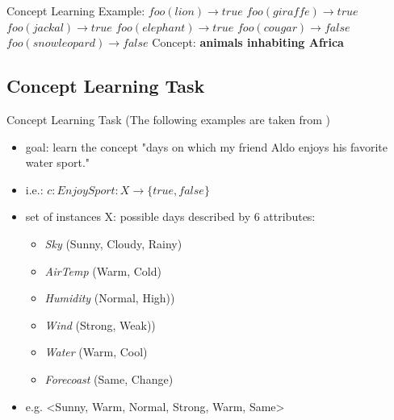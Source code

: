 \documentclass{beamer}
\begin{document}
\begin{frame}{Concept Learning}
Example:\newline
$foo(lion) \rightarrow true $\newline
$foo(giraffe) \rightarrow true $\newline
$foo(jackal) \rightarrow true $\newline
$foo(elephant) \rightarrow true $\newline
$foo(cougar) \rightarrow false $\newline
$foo(snow leopard) \rightarrow false $\newline
Concept: \textbf{animals inhabiting Africa}
\end{frame}

\subsection{Concept Learning Task}
\begin{frame}{Concept Learning Task}
(The following examples are taken from \cite{mitchell1997a})
\begin{itemize}
\item goal: learn the concept "days on which my friend Aldo enjoys his favorite water sport."
\item i.e.: $c: EnjoySport: X \rightarrow \{true, false\}$
\item set of instances X: possible days described by 6 attributes: \begin{itemize}
\item \emph{Sky} (Sunny, Cloudy, Rainy)
\item \emph{AirTemp} (Warm, Cold)
\item \emph{Humidity} (Normal, High))
\item \emph{Wind} (Strong, Weak))
\item \emph{Water} (Warm, Cool)
\item \emph{Forecoast} (Same, Change)
\end{itemize}
\item e.g. <Sunny, Warm, Normal, Strong, Warm, Same>
\end{itemize}
\end{frame}
\end{document}
